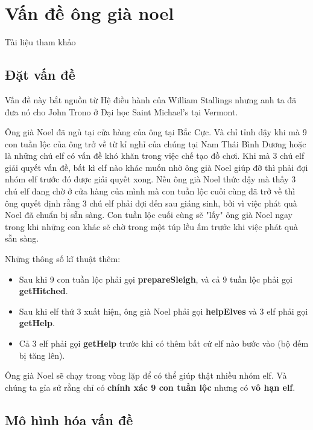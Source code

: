 \documentclass[a4paper]{article}
\begin{document}
    \section{Vấn đề ông già noel}
    Tài liệu tham khảo \cite{littlebook4}
    
    \subsection{Đặt vấn đề}
    Vấn đề này bắt nguồn từ Hệ điều hành của William Stallings nhưng anh ta đã đưa nó cho John Trono ở Đại học Saint Michael's tại Vermont.
    \begin{tcolorbox}
        Ông già Noel đã ngủ tại cửa hàng của ông tại Bắc Cực. Và chỉ tỉnh dậy khi mà 9 con tuần lộc của ông trở về từ kỉ nghỉ của chúng tại Nam Thái Bình Dương hoặc là những chú elf có vấn đề khó khăn trong việc chế tạo đồ chơi. Khi mà 3 chú elf giải quyết vấn đề, bất kì elf nào khác muốn nhờ ông già Noel giúp đỡ thì phải đợi nhóm elf trước đó được giải quyết xong. Nếu ông già Noel thức dậy mà thấy 3 chú elf đang chờ ở cửa hàng của mình mà con tuần lộc cuối cùng đã trở về thì ông quyết định rằng 3 chú elf phải đợi đến sau giáng sinh, bởi vì việc phát quà Noel đã chuẩn bị sẵn sàng. Con tuần lộc cuối cùng sẽ "lấy" ông già Noel ngay trong khi những con khác sẽ chờ trong một túp lều ấm trước khi việc phát quà sẵn sàng. 
    \end{tcolorbox}
    
    Những thông số kĩ thuật thêm:
    \begin{itemize}
        \item Sau khi 9 con tuần lộc phải gọi \textbf{prepareSleigh}, và cả 9 tuần lộc phải gọi \textbf{getHitched}.
        \item Sau khi elf thứ 3 xuất hiện, ông già Noel phải gọi \textbf{helpElves} và 3 elf phải gọi \textbf{getHelp}. 
        \item Cả 3 elf phải gọi \textbf{getHelp} trước khi có thêm bất cứ elf nào bước vào (bộ đếm bị tăng lên).
    \end{itemize}
    
    Ông già Noel sẽ chạy trong vòng lặp để có thể giúp thật nhiều nhóm elf. Và chúng ta gỉa sử rằng chỉ có \textbf{chính xác 9 con tuần lộc} nhưng có \textbf{vô hạn elf}.
    
    \subsection{Mô hình hóa vấn đề}
    
\end{document}
